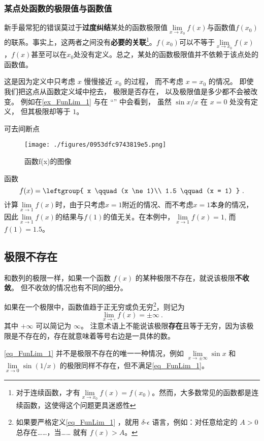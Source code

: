 \subsubsection{某点处函数的极限值与函数值}
新手最常犯的错误莫过于\textbf{过度纠结}某处的函数极限值$\lim\limits_{x\to x_0} f(x)$与函数值$f(x_0)$的联系。事实上，这两者之间没有\textbf{必要的关联}\footnote{对于连续函数，才有$\lim\limits_{x\to x_0} f(x)=f(x_0)$。然而，大多数常见的函数都是连续函数，这使得这个问题更具迷惑性}。$f(x_0)$可以不等于$\lim\limits_{x\to x_0} f(x)$，$f(x)$甚至可以在$x_0$处没有定义。总之，某处的函数极限值并不依赖于该点处的函数值。

这是因为定义中只考虑 $x$ 慢慢接近 $x_0$ 的过程， 而不考虑 $x = x_0$ 的情况。 即使我们把这点从函数定义域中挖去， 极限是否存在， 以及极限值是多少都不会被改变。 例如在\autoref{ex_FunLim_1} 与在 “” 中会看到， 虽然 $\sin x/ x$ 在 $x = 0$ 处没有定义， 但其极限却等于 $1$。

\begin{example}{可去间断点}
\begin{figure}[ht]
\centering
\texttt{[image: ./figures/0953dfc9743819e5.png]}
\caption{函数f(x)的图像} \label{fig_FunLim_4}
\end{figure}
函数
\begin{equation}
f(x) = \leftgroup{
x \qquad (x \ne 1)\\
1.5 \qquad (x = 1)
}~.\end{equation}
计算$\lim\limits_{x\to 1} f(x)$时，由于只考虑$x=1$附近的情况、而不考虑$x=1$本身的情况，因此$\lim\limits_{x\to 1} f(x)$的结果与$f(1)$的值无关。在本例中，$\lim\limits_{x\to 1} f(x)=1$, 而$f(1)=1.5$。
\end{example}

\subsection{极限不存在}
和数列的极限一样，如果一个函数 $f(x)$ 的某种极限不存在，就说该极限\textbf{不收敛}。 但不收敛的情况也有不同的细分。

如果在一个极限中，函数值趋于正无穷或负无穷\footnote{如果要严格定义\autoref{eq_FunLim_1} ，就用 $\delta$-$\epsilon$ 语言，例如：对任意给定的 $A > 0$ 总存在……，当…… 就有 $f(x) > A$。}，则记为
\begin{equation}\label{eq_FunLim_1}
\lim\limits_{x\to \square} f(x) = \pm\infty~.
\end{equation}
其中 $+\infty$ 可以简记为 $\infty$。 注意术语上不能说该极限\textbf{存在}且等于无穷，因为该极限是不存在的，存在就意味着等号右边是一具体的数。

\begin{example}{}
\autoref{eq_FunLim_1} 并不是极限不存在的唯一一种情况，例如 $\lim\limits_{x\to\pm\infty}\sin x$ 和 $\lim\limits_{x\to 0}\sin(1/x)$ 的极限同样不存在，但不满足\autoref{eq_FunLim_1}。
\end{example}
